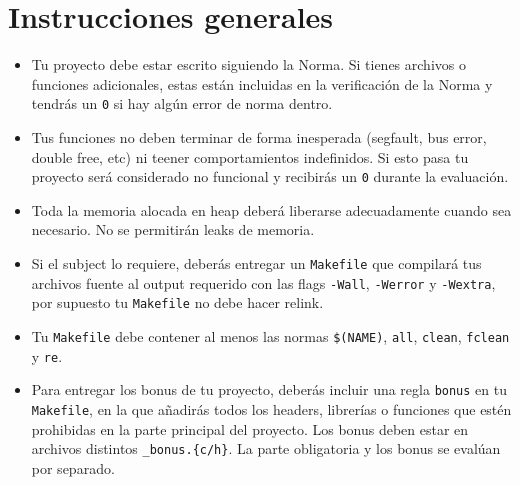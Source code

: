 
\chapter{Instrucciones generales}
\begin{itemize}
  \item Tu proyecto debe estar escrito siguiendo la Norma. Si tienes archivos o
    funciones adicionales, estas están incluidas en la verificación de la Norma
    y tendrás un \texttt{0} si hay algún error de norma dentro.

  \item Tus funciones no deben terminar de forma inesperada (segfault, bus
    error, double free, etc) ni teener comportamientos indefinidos. Si esto pasa
    tu proyecto será considerado no funcional y recibirás un \texttt{0} durante
    la evaluación.

  \item Toda la memoria alocada en heap deberá liberarse adecuadamente cuando
    sea necesario. No se permitirán leaks de memoria.

  \item Si el subject lo requiere, deberás entregar un \texttt{Makefile} que
    compilará tus archivos fuente al output requerido con las flags
    \texttt{-Wall}, \texttt{-Werror} y \texttt{-Wextra}, por supuesto tu
    \texttt{Makefile} no debe hacer relink.

  \item Tu \texttt{Makefile} debe contener al menos las normas \texttt{\$(NAME)},
    \texttt{all}, \texttt{clean}, \texttt{fclean} y \texttt{re}.

  \item Para entregar los bonus de tu proyecto, deberás incluir una regla
    \texttt{bonus} en tu \texttt{Makefile}, en la que añadirás todos los
    headers, librerías o funciones que estén prohibidas en la parte principal
    del proyecto. Los bonus deben estar en archivos distintos \texttt{\*\_bonus.\{c/h\}}.
    La parte obligatoria y los bonus se evalúan por separado.


\end{itemize}
